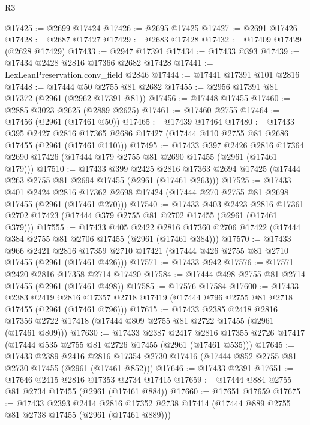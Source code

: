 \begin{lexlean}{R3}
\begin{coremodule}
@17425 := @2699 @17424
@17426 := @2695 @17425
@17427 := @2691 @17426
@17428 := @2687 @17427
@17429 := @2683 @17428
@17432 := @17409 @17429 (@2628 @17429)
@17433 := @2947 @17391
@17434 := @17433 @393
@17439 := @17434 @2428 @2816 @17366 @2682 @17428
@17441 := LexLeanPreservation.conv_field @2846
@17444 := @17441 @17391 @101 @2816
@17448 := @17444 @50 @2755 @81 @2682
@17455 := @2956 @17391 @81 @17372 (@2961 (@2962 @17391 @81))
@17456 := @17448 @17455
@17460 := @2885 @3023 @2625 (@2889 @2625)
@17461 := @17460 @2755
@17464 := @17456 (@2961 (@17461 @50))
@17465 := @17439 @17464
@17480 := @17433
    @395
    @2427
    @2816
    @17365
    @2686
    @17427
    (@17444 @110 @2755 @81 @2686 @17455 (@2961 (@17461 @110)))
@17495 := @17433
    @397
    @2426
    @2816
    @17364
    @2690
    @17426
    (@17444 @179 @2755 @81 @2690 @17455 (@2961 (@17461 @179)))
@17510 := @17433
    @399
    @2425
    @2816
    @17363
    @2694
    @17425
    (@17444 @263 @2755 @81 @2694 @17455 (@2961 (@17461 @263)))
@17525 := @17433
    @401
    @2424
    @2816
    @17362
    @2698
    @17424
    (@17444 @270 @2755 @81 @2698 @17455 (@2961 (@17461 @270)))
@17540 := @17433
    @403
    @2423
    @2816
    @17361
    @2702
    @17423
    (@17444 @379 @2755 @81 @2702 @17455 (@2961 (@17461 @379)))
@17555 := @17433
    @405
    @2422
    @2816
    @17360
    @2706
    @17422
    (@17444 @384 @2755 @81 @2706 @17455 (@2961 (@17461 @384)))
@17570 := @17433
    @966
    @2421
    @2816
    @17359
    @2710
    @17421
    (@17444 @426 @2755 @81 @2710 @17455 (@2961 (@17461 @426)))
@17571 := @17433 @942
@17576 := @17571 @2420 @2816 @17358 @2714 @17420
@17584 := @17444 @498 @2755 @81 @2714 @17455 (@2961 (@17461 @498))
@17585 := @17576 @17584
@17600 := @17433
    @2383
    @2419
    @2816
    @17357
    @2718
    @17419
    (@17444 @796 @2755 @81 @2718 @17455 (@2961 (@17461 @796)))
@17615 := @17433
    @2385
    @2418
    @2816
    @17356
    @2722
    @17418
    (@17444 @809 @2755 @81 @2722 @17455 (@2961 (@17461 @809)))
@17630 := @17433
    @2387
    @2417
    @2816
    @17355
    @2726
    @17417
    (@17444 @535 @2755 @81 @2726 @17455 (@2961 (@17461 @535)))
@17645 := @17433
    @2389
    @2416
    @2816
    @17354
    @2730
    @17416
    (@17444 @852 @2755 @81 @2730 @17455 (@2961 (@17461 @852)))
@17646 := @17433 @2391
@17651 := @17646 @2415 @2816 @17353 @2734 @17415
@17659 := @17444 @884 @2755 @81 @2734 @17455 (@2961 (@17461 @884))
@17660 := @17651 @17659
@17675 := @17433
    @2393
    @2414
    @2816
    @17352
    @2738
    @17414
    (@17444 @889 @2755 @81 @2738 @17455 (@2961 (@17461 @889)))

\end{coremodule}
\end{lexlean}
